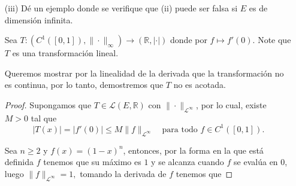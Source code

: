 \begin{enumerate}
\begin{proof}
    Como por hipótesis $E$ es un espacio vectorial de dimensión finita, tomemos la base de $E$ como $\mathcal{B}=\{v_1,v_2,\dots, v_n\}$, luego si $x\in E$ tenemos que $x=\displaystyle\sum_{i=1}^{n}x_iv_i$, entonces la transformación lineal T es de la forma,
      \begin{align*}
           Tx&=T\left( \displaystyle\sum_{i=1}^{n} x_i v_i\right) \\
           &=\displaystyle\sum_{i=1}^{n} x_i T(v_i),
        \end{align*} 
    así, tenemos que
    \begin{align*}
\|T\|_E 
&= \left\|\sum_{i=1}^{n} x_i T(v_i)\right\|_E\\
&\leq \sum_{i=1}^{n} \left\|x_i T(v_i)\right\|_E\\
    & =\sum_{i=1}^{n} |x_i| \cdot \|T(v_i)\|_E,
\end{align*}
 por el punto anterior, como $E$ es un espacio de dimensión finita existen constantes positivas $C_1$ y $C_2$, tal que $C_1\|x\|_E\leq\|x\|_1\leq C_2\|x\|_E$ y si tomamos a $M_1=\max_{\substack{1\leq i\leq n}} \|T(v_i)\|_E$, entonces,
 \begin{align*}
     \sum_{i=1}^{n} |x_i| \cdot \|T(v_i)\|_E &\leq\|x\|_1\max_{\substack{1\leq i \leq n}} \|T(v_i)\|_E,\\
     &\leq M_1 C_2\|x\|_E\\
     &=M \|x\|_E,
 \end{align*}
 por lo cual, T es acotado y continuo.
    \end{proof}
    \item[(iii)] Dé un ejemplo donde se verifique que (ii) puede ser falsa si $E$ es de dimensión infinita.
\begin{sol}
    Sea $
T: (C^1([0,1]), \|\cdot\|_{\infty}) \longrightarrow (\mathbb{R}, |\cdot|)
$
donde por $f \mapsto f'(0)$. Note que $T$ es una transformación lineal.

Queremos mostrar por la linealidad de la derivada que la transformación no es continua,  por lo tanto, demostremos que $T$ no es acotada.
\begin{proof}

Supongamos que $T \in \mathcal{L}(E, \mathbb{R})$ con $\|\cdot\|_{\mathcal{L}^\infty}$, por lo cual,  existe $M > 0$ tal que 
$$
|T(x)| = |f'(0)| \leq M \|f\|_{\mathcal{L}^\infty }\quad \text{para todo } f \in C^1([0,1]).
$$

Sea $n \geq 2$ y $f(x) = (1 - x)^n$,  entonces, por la forma en la que está definida $f$ tenemos que su máximo es $1$ y se alcanza cuando $f$ se evalúa en $0$, luego $
\|f\|_{\mathcal{L}^\infty} = 1,$ tomando la derivada de $f$ tenemos que


\end{proof}
\end{sol}
\end{enumerate}

